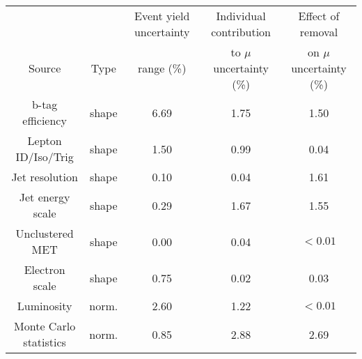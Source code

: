 \begin{adjustbox}{width=\textwidth,center=\textwidth}
\begin{tabular}{ccccc} \hline \hline
&  & Event yield uncertainty &Individual contribution & Effect of removal  \\
Source & Type & range (\%) &  to $\mu$ uncertainty (\%) & on $\mu$ uncertainty (\%) \\ \hline 
b-tag efficiency & shape & 6.69 & 1.75 & 1.50\\
Lepton ID/Iso/Trig & shape & 1.50 & 0.99 & 0.04\\
Jet resolution & shape & 0.10 & 0.04 & 1.61\\
Jet energy scale & shape & 0.29 & 1.67 & 1.55\\
Unclustered MET & shape & 0.00 & 0.04 & $<0.01$\\
Electron scale & shape & 0.75 & 0.02 & 0.03\\
Luminosity & norm. & 2.60 & 1.22 & $<0.01$\\
Monte Carlo statistics & norm. & 0.85 & 2.88 & 2.69\\
\hline 
\end{tabular}
\end{adjustbox}